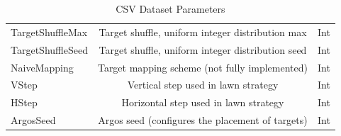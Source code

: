 \documentclass{report}
\begin{document}
\begin{table}[h]
\begin{center}
\begin{tabular}{|l|c|c|}
		TargetShuffleMax & Target shuffle, uniform integer distribution max & Int \\
		TargetShuffleSeed & Target shuffle, uniform integer distribution seed & Int \\
		NaiveMapping & Target mapping scheme (not fully implemented) & Int \\
		VStep  & Vertical step used in lawn strategy & Int \\
		HStep  & Horizontal step used in lawn strategy & Int \\
		ArgosSeed  & Argos seed (configures the placement of targets) & Int \\
		\hline
		\end{tabular}
	\end{center}
	\caption{CSV Dataset Parameters}\label{tab:csv_params}
\end{table}
\restoregeometry
\end{document}
